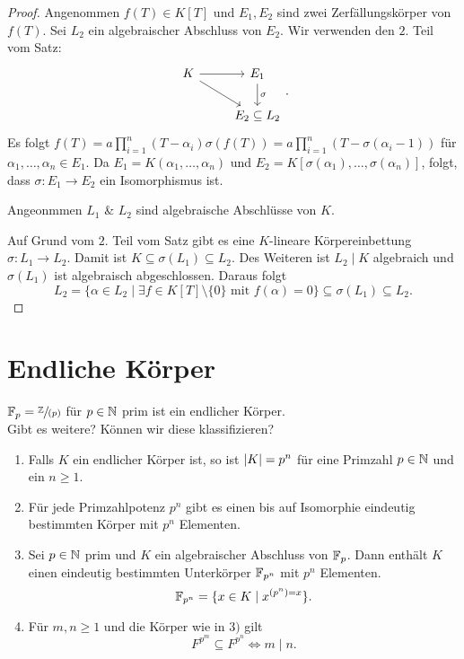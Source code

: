 \begin{proof}
	Angenommen $f(T) \in K[T]$ und $E_1,E_2$ sind zwei Zerfällungskörper von $f(T)$.
	Sei $L_2$ ein algebraischer Abschluss von $E_2$. Wir verwenden den $2.$ Teil vom Satz:
	\[
		\begin{tikzcd}
			K \arrow[r] \arrow[rd] & E_1 \arrow[d, "\sigma"] \\
                       & E_2 \subseteq L_2      
		\end{tikzcd}
	.\] 
	Es folgt $f(T) = a \prod_{i=1}^{n} (T-\alpha_{i}) \sigma(f(T)) = a \prod_{i=1}^{n} (T - \sigma(\alpha_{i} -1))$ für $\alpha_1,\ldots,\alpha_{n} \in E_1$.
	Da $E_1 = K(\alpha_1,\ldots,\alpha_{n})$ und $E_2 = K[\sigma(\alpha_1),\ldots, \sigma(\alpha_{n})]$, folgt, dass $\sigma: E_1 \to E_2$ ein
	Isomorphismus ist.

	Angeonmmen $L_1$ \& $L_2$ sind algebraische Abschlüsse von $K$.

	Auf Grund vom $2.$ Teil vom Satz gibt es eine $K$-lineare Körpereinbettung $\sigma: L_1 \to L_2$.
	Damit ist $K \subseteq \sigma(L_1) \subseteq L_2$. Des Weiteren ist $L_2 \mid K$ algebraich und $\sigma(L_1)$ ist
	algebraisch abgeschlossen. Daraus folgt
	\[
		L_2 = \{\alpha \in L_2 \mid \exists f \in K[T] \setminus \{0\} \text{ mit } f(\alpha) = 0\} \subseteq \sigma(L_1) \subseteq L_2 
	.\] 
\end{proof}

\section{Endliche Körper}
$\mathbb{F}_{p} = \sfrac{\mathbb{Z}}{(p)}$ für $p \in \mathbb{N}$ prim ist ein endlicher Körper.\\
Gibt es weitere? Können wir diese klassifizieren?

\begin{theorem}
	\begin{enumerate}
		\item Falls $K$ ein endlicher Körper ist, so ist $\abs{K} = p^{n}$ für eine Primzahl $p \in \mathbb{N}$ und ein $n \geq 1$.
		\item Für jede Primzahlpotenz $p^{n}$ gibt es einen bis auf Isomorphie eindeutig bestimmten Körper mit $p^{n}$ Elementen.
		\item Sei $p \in \mathbb{N}$ prim und $K$ ein algebraischer Abschluss von $\mathbb{F}_{p}$. Dann enthält $K$ einen eindeutig bestimmten
			Unterkörper $\mathbb{F}_{p^{n}}$ mit $p^{n}$ Elementen.
			\[
				\mathbb{F}_{p^{n}} = \{x \in K \mid x^{\left( p^{n} \right) = x}\} 
			.\] 
		\item Für $m,n \geq 1$ und die Körper wie in $3)$ gilt
			\[
			F^{p^{m}} \subseteq F^{p^{n}} \Leftrightarrow m \mid n
			.\] 
	\end{enumerate}
\end{theorem}

